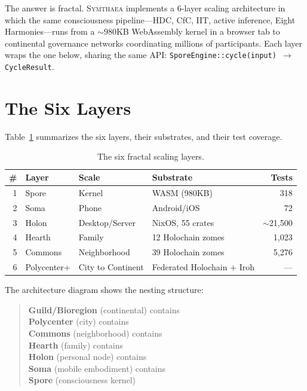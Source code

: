 \documentclass[12pt]{book}
\newcommand{\symthaea}{\textsc{Symthaea}}
\begin{document}
The answer is fractal. \symthaea{} implements a 6-layer scaling architecture in which the same consciousness pipeline---HDC, CfC, IIT, active inference, Eight Harmonies---runs from a ${\sim}980$KB WebAssembly kernel in a browser tab to continental governance networks coordinating millions of participants. Each layer wraps the one below, sharing the same API: \texttt{SporeEngine::cycle(input) $\to$ CycleResult}.

\section{The Six Layers}

Table~\ref{tab:fractal-layers} summarizes the six layers, their substrates, and their test coverage.

\begin{table}[H]
\centering
\caption{The six fractal scaling layers.}
\label{tab:fractal-layers}
\begin{tabular}{rlllr}
\toprule
\textbf{\#} & \textbf{Layer} & \textbf{Scale} & \textbf{Substrate} & \textbf{Tests} \\
\midrule
1 & Spore & Kernel & WASM (980KB) & 318 \\
2 & Soma & Phone & Android/iOS & 72 \\
3 & Holon & Desktop/Server & NixOS, 55 crates & ${\sim}$21,500 \\
4 & Hearth & Family & 12 Holochain zomes & 1,023 \\
5 & Commons & Neighborhood & 39 Holochain zomes & 5,276 \\
6 & Polycenter+ & City to Continent & Federated Holochain + Iroh & --- \\
\bottomrule
\end{tabular}
\end{table}

The architecture diagram shows the nesting structure:

\begin{quote}
\textbf{Guild/Bioregion} (continental) contains\\
\hspace*{1em}\textbf{Polycenter} (city) contains\\
\hspace*{2em}\textbf{Commons} (neighborhood) contains\\
\hspace*{3em}\textbf{Hearth} (family) contains\\
\hspace*{4em}\textbf{Holon} (personal node) contains\\
\hspace*{5em}\textbf{Soma} (mobile embodiment) contains\\
\hspace*{6em}\textbf{Spore} (consciousness kernel)
\end{quote}
\end{document}
